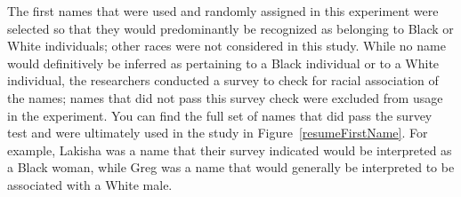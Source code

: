 The first names that were used and randomly assigned
in this experiment were selected so that they
would predominantly be recognized as belonging
to Black or White individuals;
other races were not considered in this study.
While no name would definitively be inferred as pertaining
to a Black individual or to a White individual,
the researchers conducted a survey to check for
racial association of the names;
names that did not pass this survey check were excluded
from usage in the experiment.
You can find the full set of names that did pass the
survey test and were ultimately used in the study in
Figure~\ref{resumeFirstName}.
For example, Lakisha was a name that their survey indicated
would be interpreted as a Black woman, while Greg was a name
that would generally be interpreted to be associated with
a White male.

